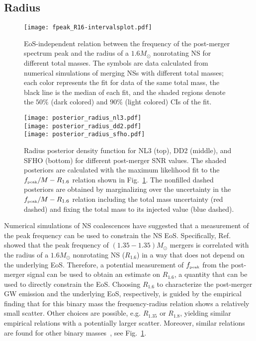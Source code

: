 \documentclass[aps,prd,amsmath,floats,floatfix, twocolumn,
superscriptaddress,nofootinbib,showpacs]{revtex4-1}
\newcommand{\peak}{{\mbox{\tiny peak}}}
\begin{document}
\subsection{Radius}
\label{sec:radius}
%
\begin{figure}[h!]
\texttt{[image: fpeak\_R16-intervalsplot.pdf]}
\caption{\label{fig:fpeak_R16-intervalsplot} EoS-independent relation between the frequency of the post-merger spectrum peak and the radius of a $1.6M_{\odot}$ nonrotating NS for different total masses. The symbols are data calculated from numerical simulations of merging NSs with different total masses; each color represents the fit for data of the same total mass, the black line is the median of each fit, and the shaded regions denote the $50\%$ (dark colored) and $90\%$ (light colored) CIs of the fit.}
\end{figure}
%

%
\begin{figure}[h!]
\texttt{[image: posterior\_radius\_nl3.pdf]}\\
\texttt{[image: posterior\_radius\_dd2.pdf]}\\
\texttt{[image: posterior\_radius\_sfho.pdf]}
\caption{\label{fig:radiusposteriors} Radius posterior density function for NL3 (top), DD2 (middle), and SFHO (bottom) for different post-merger SNR values. The shaded posteriors are calculated with the maximum likelihood fit to the $f_{\peak}/M-R_{1.6}$ relation shown in Fig.~\ref{fig:fpeak_R16-intervalsplot}. The nonfilled dashed posteriors are obtained by marginalizing over the uncertainty in the $f_{\peak}/M-R_{1.6}$ relation including the total mass uncertainty (red dashed) and fixing the total mass to its injected value (blue dashed).}
\end{figure}
%



Numerical simulations of NS coalescences have suggested that a measurement of the peak frequency can be used to constrain the NS EoS. Specifically, Ref.~\cite{bauswein:12} showed that the peak frequency of $(1.35-1.35)M_\odot$ mergers is correlated with the radius of a $1.6M_{\odot}$ nonrotating NS ($R_{1.6}$) in a way that does not depend on the underlying EoS. Therefore, a potential measurement of $f_{\peak}$ from the post-merger signal can be used to obtain an estimate on $R_{1.6}$, a quantity that can be used to directly constrain the EoS. Choosing $R_{1.6}$ to characterize the post-merger GW emission and the underlying EoS, respectively, is guided by the empirical finding that for this binary mass the frequency-radius relation shows a relatively small scatter. Other choices are possible, e.g. $R_{1.35}$ or $R_{1.8}$, yielding similar empirical relations with a potentially larger scatter. Moreover, similar relations are found for other binary masses~\cite{bauswein:12,bauswein:july15}, see Fig.~\ref{fig:fpeak_R16-intervalsplot}.
\end{document}
